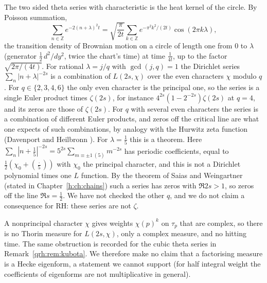 The two sided theta series with characteristic is the heat kernel of the circle. By Poisson summation,
\[
\sum_{n\in\mathbb Z}e^{-2(n+\lambda)^2t}=\sqrt{\frac{\pi}{2t}}\sum_{k\in\mathbb Z}e^{-\pi^2k^2/(2t)}\cos(2\pi k\lambda),
\]
the transition density of Brownian motion on a circle of length one from $0$ to $\lambda$ (generator $\frac12\,d^2/dy^2$, twice the chart's time) at time $\frac1{4t}$, up to the factor $\sqrt{2\pi/(4t)}$. For rational $\lambda=j/q$ with $\gcd(j,q)=1$ the Dirichlet series $\sum_n|n+\lambda|^{-2s}$ is a combination of $L(2s,\chi)$ over the even characters $\chi$ modulo $q$. For $q\in\{2,3,4,6\}$ the only even character is the principal one, so the series is a single Euler product times $\zeta(2s)$, for instance $4^{2s}(1-2^{-2s})\zeta(2s)$ at $q=4$, and its zeros are those of $\zeta(2s)$. For $q$ with several even characters the series is a combination of different Euler products, and zeros off the critical line are what one expects of such combinations, by analogy with the Hurwitz zeta function (Davenport and Heilbronn \cite{DH36}). For $\lambda=\frac15$ this is a theorem. Here $\sum_n|n+\frac15|^{-2s}=5^{2s}\sum_{m\equiv\pm1\ (5)}m^{-2s}$ has periodic coefficients, equal to $\frac12(\chi_0+(\frac\cdot5))$ with $\chi_0$ the principal character, and this is not a Dirichlet polynomial times one $L$ function. By the theorem of Saias and Weingartner \cite{SaiasWeingartner09} (stated in Chapter~\ref{h:ch:chains}) such a series has zeros with $\Re 2s>1$, so zeros off the line $\Re s=\frac12$. We have not checked the other $q$, and we do not claim a consequence for RH: these series are not $\zeta$.

A nonprincipal character $\chi$ gives weights $\chi(p)^k$ on $\tau_p$ that are complex, so there is no Thorin measure for $L(2s,\chi)$, only a complex measure, and no hitting time. The same obstruction is recorded for the cubic theta series in Remark~\ref{qrh:rem:kubota}. We therefore make no claim that a factorising measure is a Hecke eigenform, a statement we cannot support (for half integral weight the coefficients of eigenforms are not multiplicative in general).

